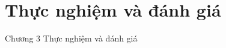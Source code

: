 \section{Thực nghiệm và đánh giá}
\begin{frame}{Chương 3}
    \Large Thực nghiệm và đánh giá
\end{frame}
